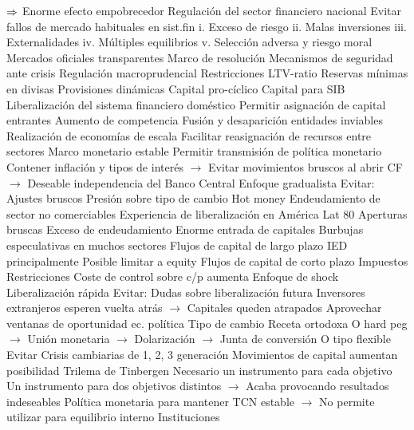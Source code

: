 \documentclass{nuevotema}
\begin{document}
\begin{esquemal}
				\4[] $\Rightarrow$ Enorme efecto empobrecedor
			\3 Regulación del sector financiero nacional
				\4 Evitar fallos de mercado habituales en sist.fin
				\4[] i. Exceso de riesgo
				\4[] ii. Malas inversiones
				\4[] iii. Externalidades
				\4[] iv. Múltiples equilibrios
				\4[] v. Selección adversa y riesgo moral
				\4 Mercados oficiales transparentes
				\4 Marco de resolución
				\4 Mecanismos de seguridad ante crisis
				\4 Regulación macroprudencial
				\4[] Restricciones LTV-ratio
				\4[] Reservas mínimas en divisas
				\4[] Provisiones dinámicas
				\4[] Capital pro-cíclico
				\4[] Capital para SIB
			\3 Liberalización del sistema financiero doméstico
				\4 Permitir asignación de capital entrantes
				\4 Aumento de competencia
				\4 Fusión y desaparición entidades inviables
				\4 Realización de economías de escala
				\4 Facilitar reasignación de recursos entre sectores
				\4 Marco monetario estable
				\4[] Permitir transmisión de política monetario
				\4[] Contener inflación y tipos de interés
				\4[] $\to$ Evitar movimientos bruscos al abrir CF
				\4[] $\to$ Deseable independencia del Banco Central
			\3 Enfoque gradualista
				\4 Evitar:
				\4[] Ajustes bruscos
				\4[] Presión sobre tipo de cambio
				\4[] Hot money
				\4[] Endeudamiento de sector no comerciables
				\4 Experiencia de liberalización en América Lat 80
				\4[] Aperturas bruscas
				\4[] Exceso de endeudamiento
				\4[] Enorme entrada de capitales
				\4[] Burbujas especulativas en muchos sectores
				\4 Flujos de capital de largo plazo
				\4[] IED principalmente
				\4[] Posible limitar a equity
				\4 Flujos de capital de corto plazo
				\4[] Impuestos
				\4[] Restricciones
				\4[] Coste de control sobre c/p aumenta
			\3 Enfoque de shock
				\4 Liberalización rápida
				\4 Evitar:
				\4[] Dudas sobre liberalización futura
				\4[] Inversores extranjeros esperen vuelta atrás
				\4[] $\to$ Capitales queden atrapados
				\4 Aprovechar ventanas de oportunidad ec. política
			\3 Tipo de cambio
				\4 Receta ortodoxa
				\4[] O hard peg
				\4[] $\to$ Unión monetaria
				\4[] $\to$ Dolarización
				\4[] $\to$ Junta de conversión
				\4[] O tipo flexible
				\4 Evitar
				\4[] Crisis cambiarias de 1, 2, 3 generación
				\4 Movimientos de capital aumentan posibilidad
				\4 Trilema de Tinbergen
				\4[] Necesario un instrumento para cada objetivo
				\4[] Un instrumento para dos objetivos distintos
				\4[] $\to$ Acaba provocando resultados indeseables
				\4[] Política monetaria para mantener TCN estable
				\4[] $\to$ No permite utilizar para equilibrio interno
			\3 Instituciones

\end{esquemal}
\end{document}
